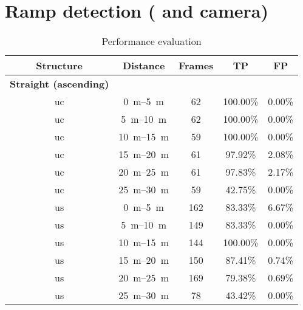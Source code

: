\section{Ramp detection ( and camera)}
\begin{table}[htbp]
    \centering
    \caption{Performance evaluation}
    \label{tab:eval_table}
    \begin{tabular}[t]{ccccc}
        \toprule
        \textbf{Structure} & \textbf{Distance}        & \textbf{Frames} & \textbf{TP} & \textbf{FP} \\
        \midrule
        \textbf{Straight (ascending)}                                                               \\
        uc                 & \SIrange{0}{5}{\metre}   & 62              & 100.00\%    & 0.00\%      \\
        uc                 & \SIrange{5}{10}{\metre}  & 62              & 100.00\%    & 0.00\%      \\
        uc                 & \SIrange{10}{15}{\metre} & 59              & 100.00\%    & 0.00\%      \\
        uc                 & \SIrange{15}{20}{\metre} & 61              & 97.92\%     & 2.08\%      \\
        uc                 & \SIrange{20}{25}{\metre} & 61              & 97.83\%     & 2.17\%      \\
        uc                 & \SIrange{25}{30}{\metre} & 59              & 42.75\%     & 0.00\%      \\
        us                 & \SIrange{0}{5}{\metre}   & 162             & 83.33\%     & 6.67\%      \\
        us                 & \SIrange{5}{10}{\metre}  & 149             & 83.33\%     & 0.00\%      \\
        us                 & \SIrange{10}{15}{\metre} & 144             & 100.00\%    & 0.00\%      \\
        us                 & \SIrange{15}{20}{\metre} & 150             & 87.41\%     & 0.74\%      \\
        us                 & \SIrange{20}{25}{\metre} & 169             & 79.38\%     & 0.69\%      \\
        us                 & \SIrange{25}{30}{\metre} & 78              & 43.42\%     & 0.00\%      \\
        \bottomrule
    \end{tabular}
\end{table}


